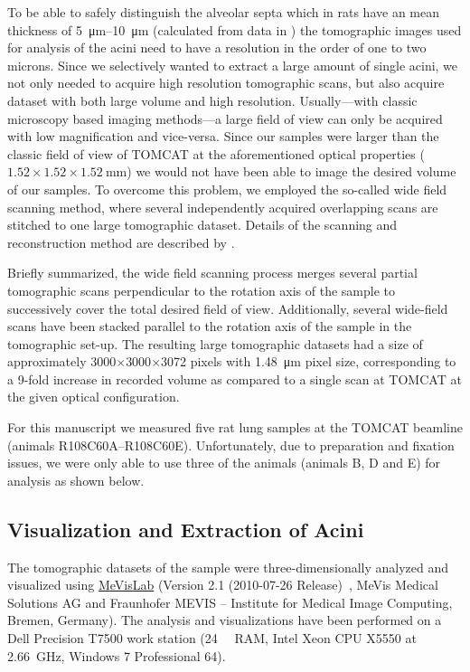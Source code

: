\documentclass[twoside,paper=a4,abstract=true,english,DIV=calc]{scrartcl}
\begin{document}
To be able to safely distinguish the alveolar septa which in rats have an mean thickness of \SIrange{5}{10}{\micro\meter} (calculated from data in \citet{Burri1974}) the tomographic images used for analysis of the acini need to have a resolution in the order of one to two microns. Since we selectively wanted to extract a large amount of single acini, we not only needed to acquire high resolution tomographic scans, but also acquire dataset with both large volume and high resolution. Usually---with classic microscopy based imaging methods---a large field of view can only be acquired with low magnification and vice-versa. Since our samples were larger than the classic field of view of TOMCAT at the aforementioned optical properties (\(1.52\times1.52\times\SI{1.52}{\milli\meter}\)) we would not have been able to image the desired volume of our samples. To overcome this problem, we employed the so-called wide field scanning method, where several independently acquired overlapping scans are stitched to one large tomographic dataset. Details of the scanning and reconstruction method are described by \citet{Haberthuer2010a}. 

Briefly summarized, the wide field scanning process merges several partial tomographic scans perpendicular to the rotation axis of the sample to successively cover the total desired field of view. Additionally, several wide-field scans have been stacked parallel to the rotation axis of the sample in the tomographic set-up. The resulting large tomographic datasets had a size of approximately 3000\(\times\)3000\(\times\)3072 pixels with \SI{1.48}{\micro\meter} pixel size, corresponding to a 9-fold increase in recorded volume as compared to a single scan at TOMCAT at the given optical configuration.

For this manuscript we measured five rat lung samples at the TOMCAT beamline (animals R108C60A--R108C60E). Unfortunately, due to preparation and fixation issues, we were only able to use three of the animals (animals B, D and E) for analysis as shown below.

\subsection{Visualization and Extraction of Acini}
The tomographic datasets of the sample were three-dimensionally analyzed and visualized using \href{http://mevislab.de}{MeVisLab} (Version 2.1 (2010-07-26 Release)~\cite{Bitter2007}, MeVis Medical Solutions AG and Fraunhofer MEVIS -- Institute for Medical Image Computing, Bremen, Germany). The analysis and visualizations have been performed on a Dell Precision T7500 work station (\SI{24}{\giga\byte} RAM, Intel Xeon CPU X5550 at \SI{2.66}{\giga\hertz}, Windows 7 Professional \SI{64}{\bit}). 
\end{document}
